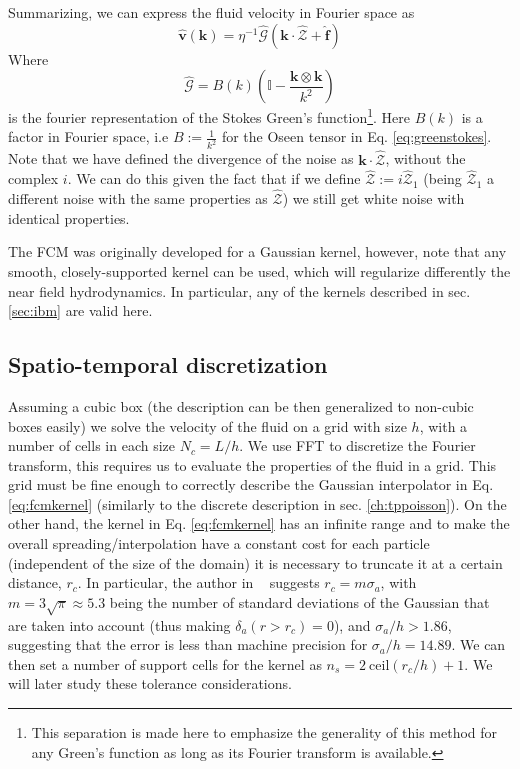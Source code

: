 \documentclass[ twoside,openright,titlepage,numbers=noenddot,%
headinclude,footinclude,cleardoublepage=empty,abstract=on,
BCOR=5mm,paper=b5,fontsize=11pt, dvipsnames
]{scrreprt}
\renewcommand{\vec}[1]{\bm{#1}}
\newcommand{\tens}[1]{\bm{\mathcal{#1}}}
\newcommand{\fou}[1]{\widehat{#1}}
\newcommand{\fvel}{v}
\begin{document}
Summarizing, we can express the fluid velocity in Fourier space as
\begin{equation}
  \label{eq:fcmvel}
  \fou{\vec{\fvel}}(\vec{k}) = \eta^{-1}\hat{\tens{G}}\left(\vec{k}\cdot\fou{\mathcal{Z}} + \fou{\vec{f}}\right)
\end{equation}
Where
\begin{equation}
  \fou{\tens{G}} = B(k)\left(\mathbb{I} - \frac{\vec{k}\otimes\vec{k}}{k^2}\right)
\end{equation}
is the fourier representation of the Stokes Green's function\footnote{This separation is made here to emphasize the generality of this method for any Green's function as long as its Fourier transform is available.}.
Here $B(k)$ is a factor in Fourier space, i.e $B := \frac{1}{k^2}$ for the Oseen tensor in Eq. \eqref{eq:greenstokes}.
Note that we have defined the divergence of the noise as $\vec{k}\cdot\fou{\mathcal{Z}}$, without the complex $i$. We can do this given the fact that if we define $\fou{\mathcal{Z}} := i\fou{\mathcal{Z}}_1$ (being $\fou{\mathcal{Z}}_1$ a different noise with the same properties as $\fou{\mathcal{Z}}$) we still get white noise with identical properties.

The \gls{FCM} was originally developed for a Gaussian kernel, however, note that any smooth, closely-supported kernel can be used, which will regularize differently the near field hydrodynamics. In particular, any of the kernels described in sec. \ref{sec:ibm} are valid here.

\subsection*{Spatio-temporal discretization}
Assuming a cubic box (the description can be then generalized to non-cubic boxes easily) we solve the velocity of the fluid on a grid with size $h$, with a number of cells in each size $N_c = L/h$.
We use \gls{FFT} to discretize the Fourier transform, this requires us to evaluate the properties of the fluid in a grid. This grid must be fine enough to correctly describe the Gaussian interpolator in Eq. \eqref{eq:fcmkernel} (similarly to the discrete description in sec. \ref{ch:tppoisson}). On the other hand, the kernel in Eq. \eqref{eq:fcmkernel} has an infinite range and to make the overall spreading/interpolation have a constant cost for each particle (independent of the size of the domain) it is necessary to truncate it at a certain distance, $r_c$. In particular, the author in ~\cite{Keaveny2014} suggests $r_c=m \sigma_a$, with $m=3\sqrt{\pi}\approx 5.3$ being the number of standard deviations of the Gaussian that are taken into account (thus making $\delta_a(r>r_c) = 0$), and $\sigma_a/h > 1.86$, suggesting that the error is less than machine precision for $\sigma_a/h = 14.89$. We can then set a number of support cells for the kernel as $n_s = 2\ \textrm{ceil}(r_c/h)+1$.
We will later study these tolerance considerations.
\end{document}
